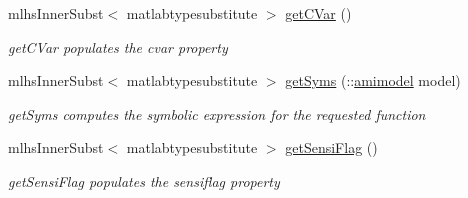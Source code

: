 \begin{DoxyCompactItemize}
mlhs\+Inner\+Subst$<$ matlabtypesubstitute $>$ \hyperlink{classamifun_a969775839d9d32ff4a0ba70395117ca7}{get\+C\+Var} ()
\begin{DoxyCompactList}\small\item\em get\+C\+Var populates the cvar property \end{DoxyCompactList}\item 
mlhs\+Inner\+Subst$<$ matlabtypesubstitute $>$ \hyperlink{classamifun_a44e49602645d85f94841f38e4673fa1a}{get\+Syms} (\+::\hyperlink{classamimodel}{amimodel} model)
\begin{DoxyCompactList}\small\item\em get\+Syms computes the symbolic expression for the requested function \end{DoxyCompactList}\item 
mlhs\+Inner\+Subst$<$ matlabtypesubstitute $>$ \hyperlink{classamifun_ac60147b051aa541057d0da18a78582a8}{get\+Sensi\+Flag} ()
\begin{DoxyCompactList}\small\item\em get\+Sensi\+Flag populates the sensiflag property \end{DoxyCompactList}\end{DoxyCompactItemize}
